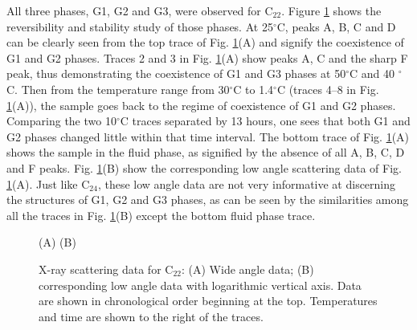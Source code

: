 All three phases, G1, G2 and G3, were observed for C$_{22}$. 
Figure \ref{c22data} shows the reversibility and stability study
of those phases. At 25$^{\circ}$C, peaks A, B, C and D can be clearly
seen from the top trace of Fig. \ref{c22data}(A) and signify the coexistence
of G1 and G2 phases. Traces 2 and 3 in Fig. \ref{c22data}(A) show peaks
A, C and the sharp F peak, thus demonstrating the coexistence of G1 and
G3 phases at 50$^{\circ}$C and 40 $^{\circ}$C. Then from the temperature 
range from 30$^{\circ}$C to 1.4$^{\circ}$C (traces 4--8 in 
Fig. \ref{c22data}(A)), the sample goes back to the regime of coexistence of
G1 and G2 phases. Comparing the two 10$^{\circ}$C traces separated by
13 hours, one sees that both G1 and G2 phases changed little within that
time interval. The bottom trace of Fig. \ref{c22data}(A) shows the sample
in the fluid phase, as signified by the absence of all A, B, C, D and F
peaks. Fig. \ref{c22data}(B) show the corresponding low angle scattering
data of Fig. \ref{c22data}(A). Just like  C$_{24}$, these low angle data
are not very informative at discerning the structures of G1, G2 and G3
phases, as can be seen by the similarities among all the traces in
Fig. \ref{c22data}(B) except the bottom fluid phase trace.
 

\begin{figure}[t]
\begin{center}
\leavevmode
\raggedleft 
\leavevmode
\raggedright 
\hspace{0.2in}
\end{center}
\vspace{-0.2in}
\hspace{1.2in} (A) \hspace{2.7in} (B)
\vspace{0.2in}
\caption{X-ray scattering data for C$_{22}$: (A) Wide angle data; (B) 
corresponding low angle data with logarithmic vertical axis. Data are 
shown in chronological order beginning at the top. Temperatures and 
time are shown to the right of the traces.
\label{c22data}}
\end{figure}

